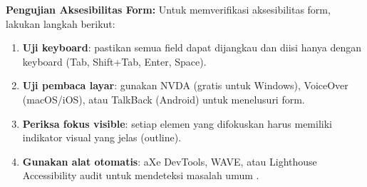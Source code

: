\begin{catatan}
\textbf{Pengujian Aksesibilitas Form:} Untuk memverifikasi aksesibilitas form, lakukan langkah berikut:
\begin{enumerate}
  \item \textbf{Uji keyboard}: pastikan semua field dapat dijangkau dan diisi hanya dengan keyboard (Tab, Shift+Tab, Enter, Space).
  \item \textbf{Uji pembaca layar}: gunakan NVDA (gratis untuk Windows), VoiceOver (macOS/iOS), atau TalkBack (Android) untuk menelusuri form.
  \item \textbf{Periksa fokus visible}: setiap elemen yang difokuskan harus memiliki indikator visual yang jelas (outline).
  \item \textbf{Gunakan alat otomatis}: aXe DevTools, WAVE, atau Lighthouse Accessibility audit untuk mendeteksi masalah umum \cite{webdevAccessibility}.
\end{enumerate}
\end{catatan}


